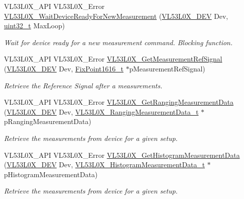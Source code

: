 \begin{DoxyCompactItemize}
V\+L53\+L0\+X\+\_\+\+A\+PI V\+L53\+L0\+X\+\_\+\+Error \hyperlink{group__VL53L0X__measurement__group_ga36e842f2f53c046d0f3a5e53f37113c3}{V\+L53\+L0\+X\+\_\+\+Wait\+Device\+Ready\+For\+New\+Measurement} (\hyperlink{group__VL53L0X__platform__group_ga2d6405308b1dd524b462f1b8fb97d167}{V\+L53\+L0\+X\+\_\+\+D\+EV} Dev, \hyperlink{vl53l0x__types_8h_a435d1572bf3f880d55459d9805097f62}{uint32\+\_\+t} Max\+Loop)
\begin{DoxyCompactList}\small\item\em Wait for device ready for a new measurement command. Blocking function. \end{DoxyCompactList}\item 
V\+L53\+L0\+X\+\_\+\+A\+PI V\+L53\+L0\+X\+\_\+\+Error \hyperlink{group__VL53L0X__measurement__group_ga744e1c15a276c1ecc68e308ac66ea414}{V\+L53\+L0\+X\+\_\+\+Get\+Measurement\+Ref\+Signal} (\hyperlink{group__VL53L0X__platform__group_ga2d6405308b1dd524b462f1b8fb97d167}{V\+L53\+L0\+X\+\_\+\+D\+EV} Dev, \hyperlink{vl53l0x__types_8h_afb910790161809fc76e1a274a6349384}{Fix\+Point1616\+\_\+t} $\ast$p\+Measurement\+Ref\+Signal)
\begin{DoxyCompactList}\small\item\em Retrieve the Reference Signal after a measurements. \end{DoxyCompactList}\item 
V\+L53\+L0\+X\+\_\+\+A\+PI V\+L53\+L0\+X\+\_\+\+Error \hyperlink{group__VL53L0X__measurement__group_ga2ed3769943964e7c24f3c8a06ef14ad7}{V\+L53\+L0\+X\+\_\+\+Get\+Ranging\+Measurement\+Data} (\hyperlink{group__VL53L0X__platform__group_ga2d6405308b1dd524b462f1b8fb97d167}{V\+L53\+L0\+X\+\_\+\+D\+EV} Dev, \hyperlink{structVL53L0X__RangingMeasurementData__t}{V\+L53\+L0\+X\+\_\+\+Ranging\+Measurement\+Data\+\_\+t} $\ast$p\+Ranging\+Measurement\+Data)
\begin{DoxyCompactList}\small\item\em Retrieve the measurements from device for a given setup. \end{DoxyCompactList}\item 
V\+L53\+L0\+X\+\_\+\+A\+PI V\+L53\+L0\+X\+\_\+\+Error \hyperlink{group__VL53L0X__measurement__group_ga774bd207d8451e932a524bd24c19e761}{V\+L53\+L0\+X\+\_\+\+Get\+Histogram\+Measurement\+Data} (\hyperlink{group__VL53L0X__platform__group_ga2d6405308b1dd524b462f1b8fb97d167}{V\+L53\+L0\+X\+\_\+\+D\+EV} Dev, \hyperlink{structVL53L0X__HistogramMeasurementData__t}{V\+L53\+L0\+X\+\_\+\+Histogram\+Measurement\+Data\+\_\+t} $\ast$p\+Histogram\+Measurement\+Data)
\begin{DoxyCompactList}\small\item\em Retrieve the measurements from device for a given setup. \end{DoxyCompactList}\item 

\end{DoxyCompactItemize}
